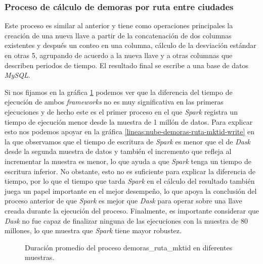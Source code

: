 \subsubsection{Proceso de cálculo de demoras por ruta entre ciudades}

Este proceso es similar al anterior y tiene como operaciones principales la creación de una nueva llave a partir de la concatenación de dos columnas existentes y después un conteo en una columna, cálculo de la desviación estándar en otras 5, agrupando de acuerdo a la nueva llave y a otras columnas que describen periodos de tiempo. El resultado final se escribe a una base de datos \textit{MySQL}.

Si nos fijamos en la gráfica \ref{lineas:nube-demoras-ruta-mktid} podemos ver que la diferencia del tiempo de ejecución de ambos \textit{frameworks} no es muy significativa en las primeras ejecuciones y de hecho este es el primer proceso en el que \textit{Spark} registra un tiempo de ejecución menor desde la muestra de 1 millón de datos. Para explicar esto nos podemos apoyar en la gráfica \ref{lineas:nube-demoras-ruta-mktid-write} en la que observamos que el tiempo de escritura de \textit{Spark} es menor que el de \textit{Dask} desde la segunda muestra de datos y también el incremento que refleja al incrementar la muestra es menor, lo que ayuda a que \textit{Spark} tenga un tiempo de escritura inferior. No obstante, esto no es suficiente para explicar la diferencia de tiempo, por lo que el tiempo que tarda \textit{Spark} en el cálculo del resultado también juega un papel importante en el mejor desempeño, lo que apoya la conclusión del proceso anterior de que \textit{Spark} es mejor que \textit{Dask} para operar sobre una llave creada durante la ejecución del proceso. Finalmente, es importante considerar que \textit{Dask} no fue capaz de finalizar ninguna de las ejecuciones con la muestra de 80 millones, lo que muestra que \textit{Spark} tiene mayor robustez.


\begin{figure}
\centering
{}
\caption{Duración promedio del proceso demoras\_ruta\_mktid en diferentes muestras.}
\label{lineas:nube-demoras-ruta-mktid}
\end{figure}


